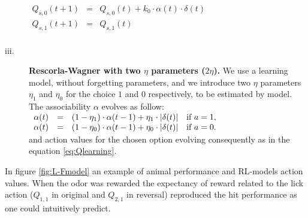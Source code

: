 \begin{description}
    $\begin{array}{lcl}
       Q_{s,0}(t+1)&=&Q_{s,0}(t)+k_0\cdot\alpha(t)\cdot\delta(t)\\
         Q_{s,1}(t+1)&=&Q_{s,1}(t)\\ 
    \end{array}$
    \item[iii.] \textbf{Rescorla-Wagner with two $\eta$ parameters ($2\eta$).} We use a learning model, without forgetting parameters, and we introduce two $\eta$ parameters $\eta_1$ and $\eta_0$ for the choice $1$ and $0$ respectively, to be estimated by model. The associability $\alpha$ evolves as follow:\\
   $\begin{array}{lcll}
    \alpha(t) & = & (1-\eta_1)\cdot\alpha(t-1)+\eta_1\cdot\left\lvert\delta(t)\right\rvert & \mbox{if\,\,}  a=1,\\
    \alpha(t) & = & (1-\eta_0)\cdot\alpha(t-1)+\eta_0\cdot\left\lvert\delta(t)\right\rvert & \mbox{if\,\,}  a=0.\\
    \end{array}$\\
    and action values for the chosen option evolving consequently as in the equation \ref{eq:Qlearning}.
\end{description}
In figure \ref{fig:L-Fmodel} an example of animal performance and RL-models action values. When the odor was rewarded the expectancy of reward related to the lick action ($Q_{1,1}$ in original and $Q_{2,1}$ in reversal) reproduced the hit performance as one could intuitively predict. %
